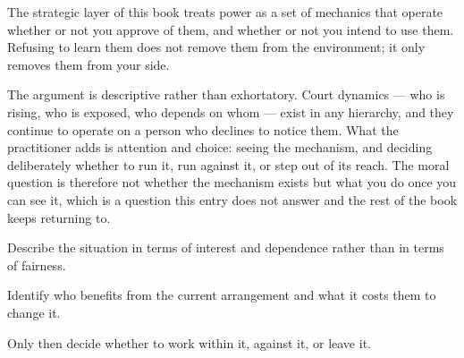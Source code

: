 


\begin{core}
The strategic layer of this book treats power as a set of mechanics that operate whether or not you approve of them, and whether or not you intend to use them. Refusing to learn them does not remove them from the environment; it only removes them from your side.
\end{core}

\begin{mechanism}
The argument is descriptive rather than exhortatory. Court dynamics --- who is rising, who is exposed, who depends on whom --- exist in any hierarchy, and they continue to operate on a person who declines to notice them. What the practitioner adds is attention and choice: seeing the mechanism, and deciding deliberately whether to run it, run against it, or step out of its reach. The moral question is therefore not whether the mechanism exists but what you do once you can see it, which is a question this entry does not answer and the rest of the book keeps returning to.
\end{mechanism}

\begin{application}
  \item Describe the situation in terms of interest and dependence rather than in terms of fairness.
  \item Identify who benefits from the current arrangement and what it costs them to change it.
  \item Only then decide whether to work within it, against it, or leave it.
\end{application}

